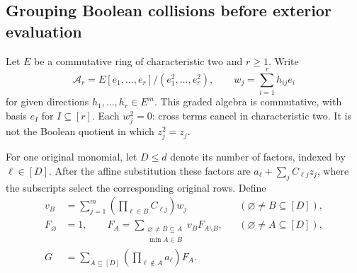 \documentclass[11pt]{article}
\theoremstyle{remark}\newtheorem{remark}[theorem]{Remark}
\begin{document}
\subsection{Grouping Boolean collisions before exterior evaluation}
Let $E$ be a commutative ring of characteristic two and $r\ge1$. Write
\[
 \mathcal A_r=E[e_1,\ldots,e_r]/(e_1^2,\ldots,e_r^2),\qquad
 w_j=\sum_{i=1}^r h_{ij}e_i
\]
for given directions $h_1,\ldots,h_r\in E^m$. This graded algebra is commutative, with basis $e_I$ for $I\subseteq[r]$. Each $w_j^2=0$: cross terms cancel in characteristic two. It is not the Boolean quotient in which $z_j^2=z_j$.

For one original monomial, let $D\le d$ denote its number of factors, indexed by $\ell\in[D]$. After the affine substitution these factors are $a_\ell+\sum_j C_{\ell j}z_j$, where the subscripts select the corresponding original rows. Define
\begin{align}
 v_B&=\sum_{j=1}^m\left(\prod_{\ell\in B}C_{\ell j}\right)w_j
       &&(\varnothing\ne B\subseteq[D]),\label{eq:blockvectors}\\
 F_\varnothing&=1,\qquad
 F_A=\sum_{\substack{\varnothing\ne B\subseteq A\\\min A\in B}}v_BF_{A\setminus B},
       &&(\varnothing\ne A\subseteq[D]),\label{eq:partitiondp}\\
 G&=\sum_{A\subseteq[D]}\left(\prod_{\ell\notin A}a_\ell\right)F_A.\label{eq:partitionoutput}
\end{align}
\end{document}
